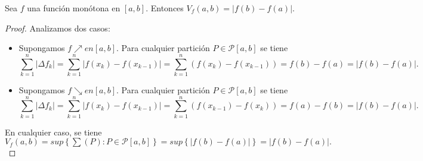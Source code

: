 \begin{lemma}

Sea $f$ una función monótona en $ \left[ a,b \right] $. Entonces $V_f \left( a,b \right) = |f\left(b\right)-f\left(a\right)|$.

\end{lemma}

\begin{proof}

Analizamos dos casos:
\begin{itemize}
  \item[\tiny{\ding{110}}] Supongamos $f \nearrow en \left[ a,b \right]$. Para cualquier partición $P \in \mathcal{P} \left[ a,b \right]$ se tiene 
  \begin{equation*}
  \sum_{k=1}^{n} |\Delta f_k|= \sum_{k=1}^{n} |f\left(x_k\right)-f\left( x_{k-1}\right)| = \sum_{k=1}^{n} \left(f\left(x_k \right)-f\left(x_{k-1} \right)\right)=f \left(b \right)-f\left(a \right)=|f\left(b \right)-f\left(a \right)|.
  \end{equation*}
  \item[\tiny{\ding{110}}] Supongamos $f \searrow en \left[ a,b \right]$. Para cualquier partición $P \in \mathcal{P} \left[ a,b \right]$ se tiene 
  \begin{equation*}
  \sum_{k=1}^{n} |\Delta f_k|= \sum_{k=1}^{n} |f\left(x_k\right)-f\left( x_{k-1}\right)| = \sum_{k=1}^{n} \left(f\left(x_{k-1} \right)-f\left(x_{k} \right)\right)=f \left(a \right)-f\left(b \right)=|f\left(b \right)-f\left(a \right)|.
  \end{equation*}
\end{itemize}
En cualquier caso, se tiene $V_f \left(a,b\right)=sup\left\lbrace\sum \left(P\right):P\in \mathcal{P} \left[a,b\right]\right\rbrace=sup\left\lbrace|f\left(b\right)-f\left(a\right)|\right\rbrace=|f\left(b\right)-f\left(a\right)|.$ 

\end{proof}
